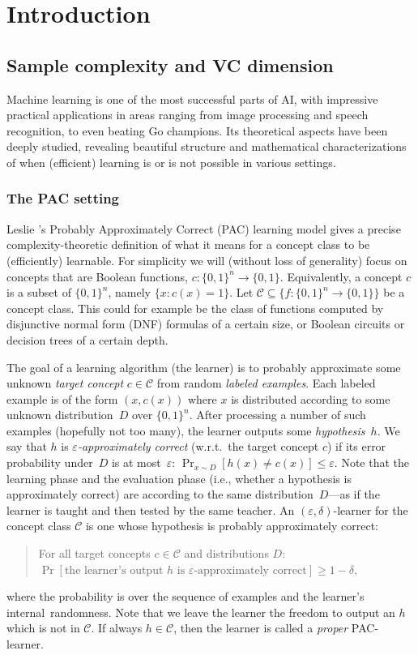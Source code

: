 \documentclass[twoside,11pt]{article}
\newcommand{\eps}{\varepsilon}
\def\01{\{0,1\}}
\newcommand{\C}{\ensuremath{\mathscr{C}}}
\begin{document}
\section{Introduction}

\subsection{Sample complexity and VC dimension}

Machine learning is one of the most successful parts of AI, with impressive practical applications in areas ranging from image processing and speech recognition, to even beating Go champions.  Its theoretical aspects have been deeply studied, revealing beautiful structure and mathematical characterizations of when (efficient) learning is or is not possible in various settings.

\subsubsection{The PAC setting}

Leslie \cite{valiant:paclearning}'s Probably Approximately Correct (PAC) learning model gives a precise complexity-theoretic definition of what it means for a concept class to be (efficiently) learnable. For simplicity we will (without loss of generality) focus on concepts that are Boolean functions, $c:\01^n\to\01$. Equivalently, a concept $c$ is a subset of $\01^n$, namely $\{x: c(x)=1\}$. Let $\C\subseteq\{f:\01^n\to\01\}$ be a concept class. This could for example be the class of functions computed by disjunctive normal form (DNF) formulas of a certain size, or Boolean circuits or decision trees of a certain depth.

The goal of a learning algorithm (the learner) is to probably approximate some unknown \emph{target concept} $c\in\C$ from random \emph{labeled examples}. Each labeled example is of the form $(x,c(x))$ where $x$ is distributed according to some unknown distribution~$D$ over $\01^n$.
After processing a number of such examples (hopefully not too many), the learner outputs some \emph{hypothesis}~$h$. We say that $h$ is \emph{$\eps$-approximately correct} (w.r.t.\ the target concept $c$)  if its error probability under~$D$ is at most~$\eps$: $\Pr_{x\sim D}[h(x)\neq c(x)]\leq\eps$. Note that the learning phase and the evaluation phase (i.e., whether a hypothesis is approximately correct) are according to the same distribution~$D$---as if the learner is taught and then tested by the same teacher. An $(\eps,\delta)$-learner for the concept class $\C$ is one whose hypothesis is probably approximately correct:
\begin{quote}
	For all target concepts $c\in\C$ and distributions $D$:\\ 
	$\Pr[\mbox{the learner's output~$h$ is $\eps$-approximately correct}]\geq 1-\delta$,
\end{quote}
where the probability is over the sequence of examples and the learner's internal~randomness. Note that we leave the learner the freedom to output an $h$ which is not in $\C$. If always $h\in\C$, then the learner is called a \emph{proper} PAC-learner.
\end{document}
